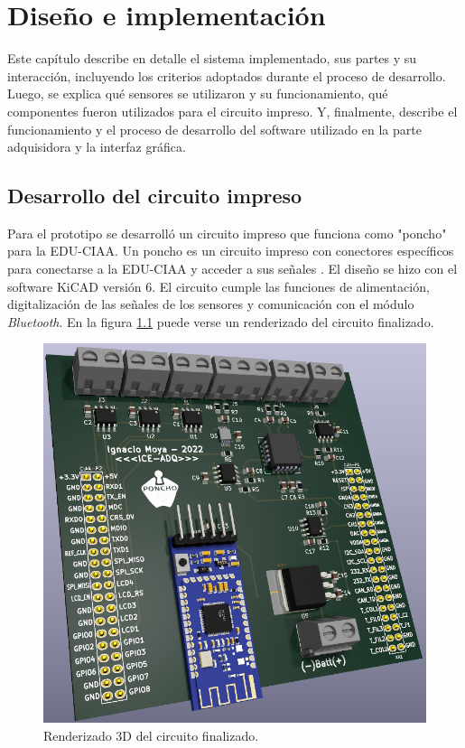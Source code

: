 \chapter{Diseño e implementación} %

\label{Chapter3}

Este capítulo describe en detalle el sistema implementado, sus partes y su interacción, incluyendo los criterios adoptados durante el proceso de desarrollo. Luego, se explica qué sensores se utilizaron y su funcionamiento, qué componentes fueron utilizados para el circuito impreso. Y, finalmente, describe el funcionamiento y el proceso de desarrollo del software utilizado en la parte adquisidora y la interfaz gráfica.

\section{Desarrollo del circuito impreso} \label{circuito}

Para el prototipo se desarrolló un circuito impreso que funciona como "poncho"  para la EDU-CIAA. Un poncho es un circuito impreso con conectores específicos para conectarse a la EDU-CIAA y acceder a sus señales \cite{poncho}. El diseño se hizo con el software KiCAD versión 6. El circuito cumple las funciones de alimentación, digitalización de las señales de los sensores y comunicación con el módulo \textit{Bluetooth}. En la figura \ref{fig:circuito-3d} puede verse un renderizado del circuito finalizado. 

\begin{figure}[htpb]
\centering
\includegraphics[width=.8\textwidth]{./Figures/circuito-3d.png}
\caption{Renderizado 3D del circuito finalizado.}
\label{fig:circuito-3d}
\end{figure}


